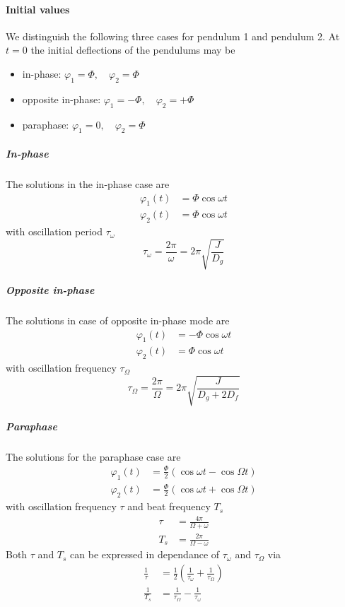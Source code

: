 \documentclass{scrreprt}
\renewcommand{\phi}{\varphi}
\begin{document}
\paragraph{Initial values}
We distinguish the following three cases for pendulum 1 and pendulum 2. At $t=0$ the initial deflections of the pendulums may be
\begin{itemize}
\item in-phase: $\phi_1 = \Phi, \quad \phi_2 = \Phi$
\item opposite in-phase: $\phi_1 = -\Phi, \quad \phi_2 = +\Phi$
\item paraphase: $\phi_1 = 0, \quad \phi_2 = \Phi$
\end{itemize}

\subparagraph*{In-phase}
The solutions in the in-phase case are
\begin{align}
\phi_1(t) &= \Phi \cos{\omega t}\\
\phi_2(t) &= \Phi \cos{\omega t}
\end{align}
with oscillation period $\tau_{\omega}$
\begin{equation}
\tau_{\omega} = \frac{2 \pi}{\omega} = 2 \pi \sqrt{\frac{J}{D_g}}
\end{equation}

\subparagraph*{Opposite in-phase}
The solutions in case of opposite in-phase mode are
\begin{align}
\phi_1(t) &= -\Phi \cos{\omega t}\\
\phi_2(t) &= \Phi \cos{\omega t}
\end{align}
with oscillation frequency $\tau_{\Omega}$
\begin{equation}
\tau_{\Omega} = \frac{2 \pi}{\Omega} = 2 \pi \sqrt{\frac{J}{D_g+2 D_f}}
\end{equation}

\subparagraph*{Paraphase}
The solutions for the paraphase case are
\begin{align}
\phi_1(t) &= \frac{\Phi}{2}\left(\cos{\omega t} - \cos{\Omega t}\right)\\
\phi_2(t) &= \frac{\Phi}{2}\left(\cos{\omega t} + \cos{\Omega t}\right)
\end{align}
with oscillation frequency $\tau$ and beat frequency $T_s$
\begin{align}
\tau &= \frac{4 \pi}{\Omega + \omega}\\
T_s &= \frac{2 \pi}{\Omega -\omega}
\end{align}
Both $\tau$ and $T_s$ can be expressed in dependance of $\tau_{\omega}$ and $\tau_{\Omega}$ via
\begin{align}
\frac{1}{\tau} &= \frac{1}{2}\left( \frac{1}{\tau_{\omega}} + \frac{1}{\tau_{\Omega}} \right)\label{tau}\\
\frac{1}{T_s} &= \frac{1}{\tau_{\Omega}} - \frac{1}{\tau_{\omega}}\label{ts}
\end{align}
\end{document}
